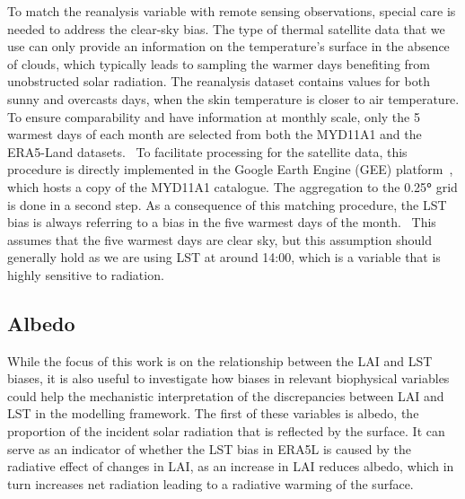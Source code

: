 \documentclass[gmd, manuscript]{copernicus}
\begin{document}
To match the reanalysis variable with remote sensing observations,
special care is needed to address the clear-sky bias. The type of
thermal satellite data that we use can only provide an information on
the temperature's surface in the absence of clouds, which typically
leads to sampling the warmer days benefiting from unobstructed solar
radiation. The reanalysis dataset contains values for both sunny and
overcasts days, when the skin temperature is closer to air temperature.
To ensure comparability and have information at monthly scale, only the
5 warmest days of each month are selected from both the MYD11A1 and the
ERA5-Land datasets.~ To facilitate processing for the satellite data,
this procedure is directly implemented in the Google Earth Engine (GEE)
platform~\citep{Gorelick_2017}, which hosts a copy of the MYD11A1
catalogue. The aggregation to the 0.25\textbf{°} grid is done in a
second step. As a consequence of this matching procedure, the LST bias
is always referring to a bias in the five warmest{ days of the month}.~
This assumes that the five warmest days are clear sky, but this
assumption should generally hold as we are using LST at around 14:00,
which is a variable that is highly sensitive to radiation.


\subsection{Albedo}

While the focus of this work is on the relationship between the LAI and
LST biases, it is also useful to investigate how biases in relevant
biophysical variables could help the mechanistic interpretation of the
discrepancies between LAI and LST in the modelling framework. The first
of these variables is albedo, the proportion of the incident solar
radiation that is reflected by the surface. It can serve as an indicator
of whether the LST bias in ERA5L is caused by the radiative effect of
changes in LAI, as an increase in LAI reduces albedo, which in turn
increases net radiation leading to a radiative warming of the surface.
\end{document}
